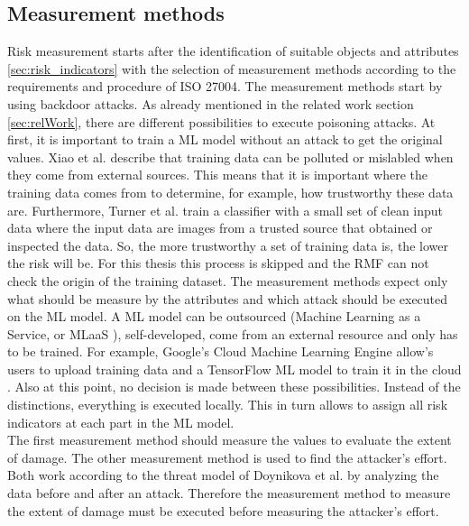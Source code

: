 \subsection{Measurement methods}

Risk measurement starts after the identification of suitable objects and attributes \ref{sec:risk_indicators} with the selection of measurement methods according to the requirements and procedure of ISO 27004. The measurement methods start by using backdoor attacks. As already mentioned in the related work section \ref{sec:relWork}, there are different possibilities to execute poisoning attacks. At first, it is important to train a ML model without an attack to get the original values.
Xiao et al. \cite{DBLP:conf/sp/XiaoLZX18} describe that training data can be polluted or mislabled when they come from external sources. This means that it is important where the training data comes from to determine, for example, how trustworthy these data are. Furthermore, Turner et al. \cite{turner2018clean} train a classifier with a
small set of clean input data where the input data are images from a trusted source that obtained or inspected the data. So, the more trustworthy a set of training data is, the lower the risk will be. For this thesis this process is skipped and the RMF can not check the origin of the training dataset. The measurement methods expect only what should be measure by the attributes and which attack should be executed on the ML model. A ML model can be outsourced (Machine Learning as a Service, or MLaaS \cite{DBLP:journals/corr/abs-1708-06733}), self-developed, come from an external resource and only has to be trained. For example, Google's Cloud Machine Learning Engine \cite{google_ai2022} allow's users to upload training data and a TensorFlow ML model to train it in the cloud \cite{DBLP:journals/corr/abs-1708-06733}. Also at this point, no decision is made between these possibilities. Instead of the distinctions, everything is executed locally. This in turn allows to assign all risk indicators at each part in the ML model. \\
The first measurement method should measure the values to evaluate the extent of damage. The other measurement method is used to find the attacker's effort. Both work according to the threat model of Doynikova et al. \cite{DBLP:conf/crisis/DoynikovaNGK20} by analyzing the data before and after an attack. Therefore the measurement method to measure the extent of damage must be executed before measuring the attacker's effort.

